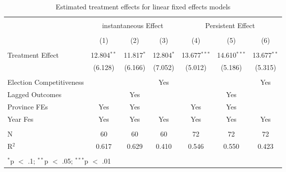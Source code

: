 
\begin{table}[!htbp] \centering 
  \caption{Estimated treatment effects for linear fixed effects models} 
  \label{res:lfe} 
\begin{tabular}{@{\extracolsep{5pt}}lcccccc} 
\\[-1.8ex]\hline 
\hline \\[-1.8ex] 
 & \multicolumn{3}{c}{instantaneous Effect} & \multicolumn{3}{c}{Persistent Effect} \\ 
\\[-1.8ex] & (1) & (2) & (3) & (4) & (5) & (6)\\ 
\hline \\[-1.8ex] 
 Treatment Effect & 12.804$^{**}$ & 11.817$^{*}$ & 12.804$^{*}$ & 13.677$^{***}$ & 14.610$^{***}$ & 13.677$^{**}$ \\ 
  & (6.128) & (6.166) & (7.052) & (5.012) & (5.186) & (5.315) \\ 
 \hline \\[-1.8ex] 
Election Competitiveness &  &  & Yes &  &  & Yes \\ 
Lagged Outcomes &  & Yes &  &  & Yes &  \\ 
Province FEs & Yes & Yes &  & Yes & Yes &  \\ 
Year Fes & Yes & Yes & Yes & Yes & Yes & Yes \\ 
\hline \\[-1.8ex] 
N & 60 & 60 & 60 & 72 & 72 & 72 \\ 
R$^{2}$ & 0.617 & 0.629 & 0.410 & 0.546 & 0.550 & 0.423 \\ 
\hline 
\hline \\[-1.8ex] 
\multicolumn{7}{l}{$^{*}$p $<$ .1; $^{**}$p $<$ .05; $^{***}$p $<$ .01} \\ 
\end{tabular} 
\end{table} 
